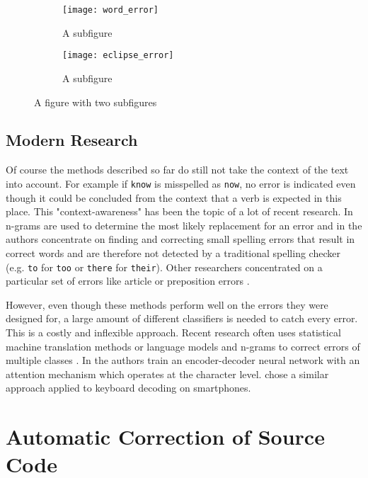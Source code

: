 \begin{figure}
\centering
\begin{subfigure}[b]{.5\textwidth}
  \centering
  \texttt{[image: word\_error]}
  \caption{A subfigure}
  \label{fig:sub1}
\end{subfigure}%
\begin{subfigure}[b]{.5\textwidth}
  \centering
  \texttt{[image: eclipse\_error]}
  \caption{A subfigure}
  \label{fig:sub2}
\end{subfigure}
\caption{A figure with two subfigures}
\label{fig:test}
\end{figure}

\subsection{Modern Research}

Of course the methods described so far do still not take the context of the text into account. For example if \texttt{know} is misspelled as \texttt{now}, no error is indicated even though it could be concluded from the context that a verb is expected in this place. This "context-awareness" has been the topic of a lot of recent research. In \cite{context_n_gram} n-grams are used to determine the most likely replacement for an error and in \cite{context_sensitive_spelling} the authors concentrate on finding and correcting small spelling errors that result in correct words and are therefore not detected by a traditional spelling checker (e.g. \texttt{to} for \texttt{too} or \texttt{there} for \texttt{their}). Other researchers concentrated on a particular set of errors like article \cite{article_correction} or preposition errors \cite{preposition_correction}.

However, even though these methods perform well on the errors they were designed for, a large amount of different classifiers is needed to catch every error. This is a costly and inflexible approach. Recent research often uses statistical machine translation methods or language models and n-grams to correct errors of multiple classes \cite{grammatical_error_task}. In \cite{seq2seq_on_text_correction} the authors train an encoder-decoder neural network with an attention mechanism which operates at the character level. \cite{seq2seq_keyboard} chose a similar approach applied to keyboard decoding on smartphones.

\section{Automatic Correction of Source Code}

